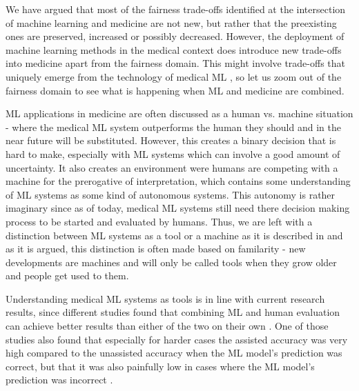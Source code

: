 
We have argued that most of the fairness trade-offs identified at the intersection of machine learning and medicine are not new, but rather that the preexisting ones are preserved, increased or possibly decreased. However, the deployment of machine learning methods in the medical context does introduce new trade-offs into medicine apart from the fairness domain. This might involve trade-offs that uniquely emerge from the technology of medical ML \cite{Dijkstra2020}, so let us zoom out of the fairness domain to see what is happening when ML and medicine are combined. 

ML applications in medicine are often discussed as a human vs. machine situation - where the medical ML system outperforms the human they should and in the near future will be substituted. However, this creates a binary decision that is hard to make, especially with ML systems which can involve a good amount of uncertainty. It also creates an environment were humans are competing with a machine for the prerogative of interpretation, which contains some understanding of ML systems as some kind of autonomous systems. This autonomy is rather imaginary since as of today, medical ML systems still need there decision making process to be started and evaluated by humans. Thus, we are left with a distinction between ML systems as a tool or a machine as it is described in \cite{Williamson2021} and as it is argued, this distinction is often made based on familarity - new developments are machines and will only be called tools when they grow older and people get used to them. 

Understanding medical ML systems as tools is in line with current research results, since different studies found that combining ML and human evaluation can achieve better results than either of the two on their own \cite{rajpurkar2022ai, kiani2020impact, topol2019high, steiner2018impact}. One of those studies also found that especially for harder cases the assisted accuracy was very high compared to the unassisted accuracy when the ML model's prediction was correct, but that it was also painfully low in cases where the ML model's prediction was incorrect \cite{kiani2020impact}. 


